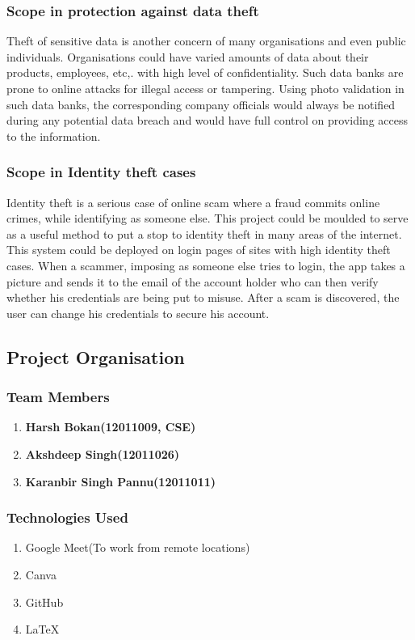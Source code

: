 \documentclass[12pt, oneside, a4paper]{article}
\begin{document}
\subsubsection{Scope in protection against data theft}
Theft of sensitive data is another concern of many organisations and even public individuals. Organisations could have varied amounts of data about their products, employees, etc,. with high level of confidentiality. Such data banks are prone to online attacks for illegal access or tampering. Using photo validation in such data banks, the corresponding company officials would always be notified during any potential data breach and would have full control on providing access to the information.
\subsubsection{Scope in Identity theft cases}
Identity theft is a serious case of online scam where a fraud commits online crimes, while identifying as someone else. This project could be moulded to serve as a useful method to put a stop to identity theft in many areas of the internet. This system could be deployed on login pages of sites with high identity theft cases. When a scammer, imposing as someone else tries to login, the app takes a picture and sends it to the email of the account holder who can then verify whether his credentials are being put to misuse. After a scam is discovered, the user can change his credentials to secure his account. 

\pagebreak

\subsection{Project Organisation}
\vspace{1cm}
\subsubsection{Team Members}
\begin{enumerate}
    \itemsep0em
    \item \textbf{Harsh Bokan(12011009, CSE)}
    \item \textbf{Akshdeep Singh(12011026)}
    \item \textbf{Karanbir Singh Pannu(12011011)}
\end{enumerate}

\subsubsection{Technologies Used}
\begin{enumerate}
    \itemsep0em
    \item Google Meet(To work from remote locations)
    \item Canva
    \item GitHub
    \item \LaTeX
\end{enumerate}
\end{document}
